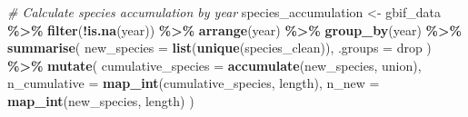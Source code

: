 \documentclass[
]{article}
\newenvironment{Shaded}{\begin{snugshade}}{\end{snugshade}}
\newcommand{\AttributeTok}[1]{\textcolor[rgb]{0.13,0.29,0.53}{#1}}
\newcommand{\CommentTok}[1]{\textcolor[rgb]{0.56,0.35,0.01}{\textit{#1}}}
\newcommand{\FunctionTok}[1]{\textcolor[rgb]{0.13,0.29,0.53}{\textbf{#1}}}
\newcommand{\NormalTok}[1]{#1}
\newcommand{\OtherTok}[1]{\textcolor[rgb]{0.56,0.35,0.01}{#1}}
\newcommand{\SpecialCharTok}[1]{\textcolor[rgb]{0.81,0.36,0.00}{\textbf{#1}}}
\newcommand{\StringTok}[1]{\textcolor[rgb]{0.31,0.60,0.02}{#1}}
\begin{document}
\begin{Shaded}
\begin{Highlighting}[]
\CommentTok{\# Calculate species accumulation by year}
\NormalTok{species\_accumulation }\OtherTok{\textless{}{-}}\NormalTok{ gbif\_data }\SpecialCharTok{\%\textgreater{}\%}
  \FunctionTok{filter}\NormalTok{(}\SpecialCharTok{!}\FunctionTok{is.na}\NormalTok{(year)) }\SpecialCharTok{\%\textgreater{}\%}
  \FunctionTok{arrange}\NormalTok{(year) }\SpecialCharTok{\%\textgreater{}\%}
  \FunctionTok{group\_by}\NormalTok{(year) }\SpecialCharTok{\%\textgreater{}\%}
  \FunctionTok{summarise}\NormalTok{(}
    \AttributeTok{new\_species =} \FunctionTok{list}\NormalTok{(}\FunctionTok{unique}\NormalTok{(species\_clean)),}
    \AttributeTok{.groups =} \StringTok{\textquotesingle{}drop\textquotesingle{}}
\NormalTok{  ) }\SpecialCharTok{\%\textgreater{}\%}
  \FunctionTok{mutate}\NormalTok{(}
    \AttributeTok{cumulative\_species =} \FunctionTok{accumulate}\NormalTok{(new\_species, union),}
    \AttributeTok{n\_cumulative =} \FunctionTok{map\_int}\NormalTok{(cumulative\_species, length),}
    \AttributeTok{n\_new =} \FunctionTok{map\_int}\NormalTok{(new\_species, length)}
\NormalTok{  )}


\end{Highlighting}
\end{Shaded}
\end{document}
